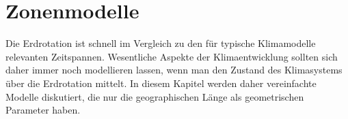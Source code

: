 %
%
%
\chapter{Zonenmodelle\label{chapter:zonenmodelle}}
Die Erdrotation ist schnell im Vergleich zu den für typische Klimamodelle
relevanten Zeitspannen.
Wesentliche Aspekte der Klimaentwicklung sollten sich daher immer
noch modellieren lassen, wenn man den Zustand des Klimasystems über
die Erdrotation mittelt.
In diesem Kapitel werden daher vereinfachte Modelle diskutiert,
die nur die geographischen Länge als geometrischen Parameter haben.






